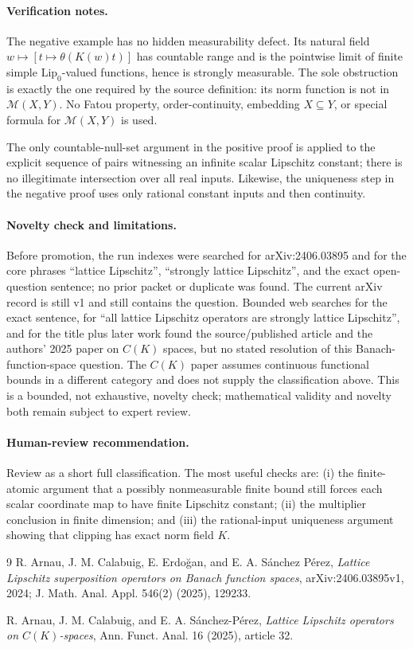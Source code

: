 \documentclass[11pt]{article}
\newcommand{\Lip}{\mathrm{Lip}}
\newcommand{\M}{\mathcal M}
\newcommand{\1}{\mathbf 1}
\begin{document}
\paragraph{Verification notes.}
The negative example has no hidden measurability defect.  Its natural field
$w\mapsto[t\mapsto\theta(K(w)t)]$ has countable range and is the pointwise
limit of finite simple $\Lip_0$-valued functions, hence is strongly
measurable.  The sole obstruction is exactly the one required by the source
definition: its norm function is not in $\M(X,Y)$.  No Fatou property,
order-continuity, embedding $X\subseteq Y$, or special formula for
$\M(X,Y)$ is used.

The only countable-null-set argument in the positive proof is applied to the
explicit sequence of pairs witnessing an infinite scalar Lipschitz constant;
there is no illegitimate intersection over all real inputs.  Likewise, the
uniqueness step in the negative proof uses only rational constant inputs and
then continuity.

\paragraph{Novelty check and limitations.}
Before promotion, the run indexes were searched for arXiv:2406.03895 and for
the core phrases ``lattice Lipschitz'', ``strongly lattice Lipschitz'', and
the exact open-question sentence; no prior packet or duplicate was found.
The current arXiv record is still v1 and still contains the question.
Bounded web searches for the exact sentence, for ``all lattice Lipschitz
operators are strongly lattice Lipschitz'', and for the title plus later work
found the source/published article and the authors' 2025 paper on $C(K)$
spaces, but no stated resolution of this Banach-function-space question.  The
$C(K)$ paper assumes continuous functional bounds in a different category
and does not supply the classification above.  This is a bounded, not
exhaustive, novelty check; mathematical validity and novelty both remain
subject to expert review.

\paragraph{Human-review recommendation.}
Review as a short full classification.  The most useful checks are: (i) the
finite-atomic argument that a possibly nonmeasurable finite bound still forces
each scalar coordinate map to have finite Lipschitz constant; (ii) the
multiplier conclusion in finite dimension; and (iii) the rational-input
uniqueness argument showing that clipping has exact norm field $K$.

\begin{thebibliography}{9}
R. Arnau, J. M. Calabuig, E. Erdo\u{g}an, and E. A. S\'anchez P\'erez,
\emph{Lattice Lipschitz superposition operators on Banach function spaces},
arXiv:2406.03895v1, 2024; J. Math. Anal. Appl. 546(2) (2025), 129233.

R. Arnau, J. M. Calabuig, and E. A. S\'anchez-P\'erez,
\emph{Lattice Lipschitz operators on $C(K)$-spaces},
Ann. Funct. Anal. 16 (2025), article 32.
\end{thebibliography}
\end{document}
